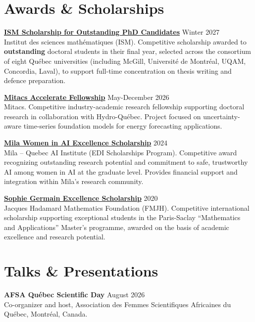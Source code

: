 \documentclass[10pt, a4paper]{article}
\begin{document}
\section{Awards \& Scholarships}
\vspace{0.3em}
\noindent \textbf{\href{https://ism.uqam.ca/scholarships/}{ISM Scholarship for Outstanding PhD Candidates}} \hfill Winter 2027 \\
{\small Institut des sciences math\'ematiques (ISM). Competitive scholarship awarded to \textbf{outstanding} doctoral students in their final year, selected across the consortium of eight Qu\'ebec universities (including McGill, Universit\'e de Montr\'eal, UQAM, Concordia, Laval), to support full-time concentration on thesis writing and defence preparation.}

\noindent \textbf{\href{https://www.mitacs.ca/our-programs/accelerate/}{Mitacs Accelerate Fellowship}} \hfill May-December 2026 \\
{\small Mitacs. Competitive industry-academic research fellowship supporting doctoral research in collaboration with Hydro-Québec. Project focused on uncertainty-aware time-series foundation models for energy forecasting applications.}

\noindent \textbf{\href{https://mila.quebec/en/news/a-fourth-edition-for-the-mila-edi-scholarship-program}{Mila Women in AI Excellence Scholarship}} \hfill 2024 \\
{\small Mila -- Quebec AI Institute (EDI Scholarships Program). Competitive award recognizing outstanding research potential and commitment to safe, trustworthy AI among women in AI at the graduate level. Provides financial support and integration within Mila's research community.}

\vspace{0.3em}
\noindent \textbf{\href{https://www.fondation-hadamard.fr/en/our-programs/transversal-programs/graduate-program/apply-for-a-sophie-germain-scholarship/}{Sophie Germain Excellence Scholarship}} \hfill 2020 \\
{\small Jacques Hadamard Mathematics Foundation (FMJH). Competitive international scholarship supporting exceptional students in the Paris-Saclay ``Mathematics and Applications'' Master's programme, awarded on the basis of academic excellence and research potential.}

\section{Talks \& Presentations}
\vspace{0.3em}
\noindent \textbf{AFSA Québec Scientific Day} \hfill August 2026 \\
{\small Co-organizer and host, Association des Femmes Scientifiques Africaines du Québec, Montréal, Canada.}
\end{document}

